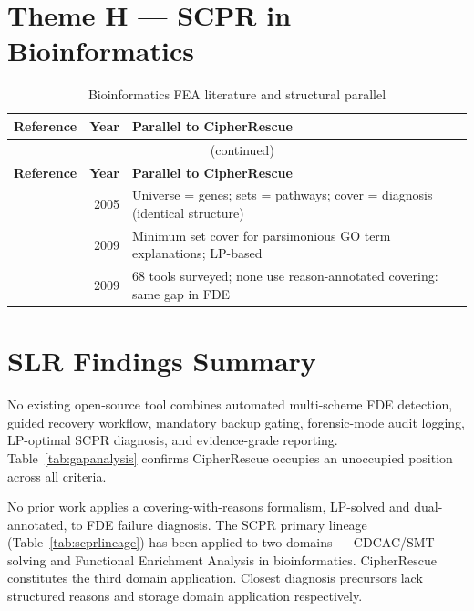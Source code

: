 \documentclass[11pt,a4paper]{report}
\begin{document}
\section{Theme H --- SCPR in Bioinformatics}

\begin{longtable}{@{}p{5.5cm}rp{7cm}@{}}
\caption{Bioinformatics FEA literature and structural parallel}\label{tab:themeH}\\
\toprule \textbf{Reference} & \textbf{Year} & \textbf{Parallel to CipherRescue} \\ \midrule
\endfirsthead
\multicolumn{3}{c}{\tablename\ \thetable{} (continued)}\\ \toprule \textbf{Reference} & \textbf{Year} & \textbf{Parallel to CipherRescue} \\ \midrule
\endhead
\citet{subramanian2005} & 2005 & Universe = genes; sets = pathways; cover = diagnosis (identical structure) \\
\citet{eden2009} & 2009 & Minimum set cover for parsimonious GO term explanations; LP-based \\
\citet{huang2009} & 2009 & 68 tools surveyed; none use reason-annotated covering: same gap in FDE \\
\bottomrule
\end{longtable}

\section{SLR Findings Summary}

\begin{tcolorbox}[enhanced, colback=lightgreen!30, colframe=forestgreen, title={Finding 1 --- Tool Gap Confirmed}, fonttitle=\bfseries, arc=4pt]
No existing open-source tool combines automated multi-scheme FDE detection, guided recovery workflow, mandatory backup gating, forensic-mode audit logging, LP-optimal SCPR diagnosis, and evidence-grade reporting. Table~\ref{tab:gapanalysis} confirms CipherRescue occupies an unoccupied position across all criteria.
\end{tcolorbox}

\vspace{6pt}

\begin{tcolorbox}[enhanced, colback=lightblue!30, colframe=royalblue, title={Finding 2 --- Theoretical Gap Confirmed}, fonttitle=\bfseries, arc=4pt]
No prior work applies a covering-with-reasons formalism, LP-solved and dual-annotated, to FDE failure diagnosis. The SCPR primary lineage (Table~\ref{tab:scprlineage}) has been applied to two domains --- CDCAC/SMT solving and Functional Enrichment Analysis in bioinformatics. CipherRescue constitutes the third domain application. Closest diagnosis precursors \citep{reiter1987,ignatiev2019} lack structured reasons and storage domain application respectively.
\end{tcolorbox}
\end{document}
